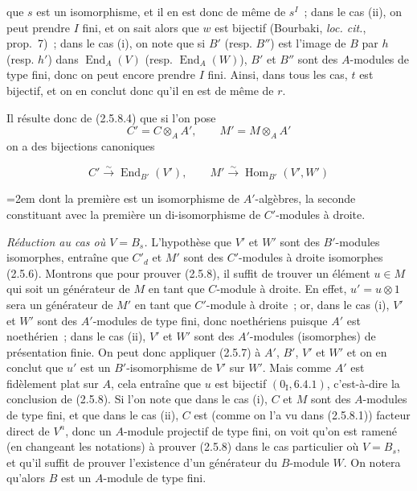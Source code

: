 que $s$ est un isomorphisme, et il en est donc de même de $s^I$~; dans le cas
(ii), on peut prendre $I$ fini, et on sait alors que $w$ est bijectif
(Bourbaki, \emph{loc. cit.}, prop.~7)~; dans le cas (i), on note que si $B'$
(resp. $B''$) est l'image de $B$ par $h$ (resp. $h'$) dans
$\operatorname{End}_A(V)$ (resp. $\operatorname{End}_A(W)$), $B'$ et $B''$
sont des $A$-modules de type fini, donc on peut encore prendre $I$ fini.
Ainsi, dans tous les cas, $t$ est bijectif, et on en conclut donc qu'il en est
de même de $r$.

Il résulte donc de (2.5.8.4) que si l'on pose
\[
C'=C\otimes_A A',\qquad M'=M\otimes_A A'
\]
on a des bijections canoniques

\begin{env}[2.5.8.6]
\label{IV.2.5.8.6-fr}
\[
C'\xrightarrow{\sim}\operatorname{End}_{B'}(V'),\qquad
M'\xrightarrow{\sim}\operatorname{Hom}_{B'}(V',W')
\]
{\emergencystretch=2em
dont la première est un isomorphisme de $A'$-algèbres, la seconde constituant
avec la première un di-isomorphisme de $C'$-modules à droite.\par}
\end{env}

\begin{env}[2.5.8.7]
\label{IV.2.5.8.7-fr}
\emph{Réduction au cas où $V=B_s$.} L'hypothèse que $V'$ et $W'$ sont des
$B'$-modules isomorphes, entraîne que $C'_d$ et $M'$ sont des $C'$-modules à
droite isomorphes (2.5.6). Montrons que pour prouver (2.5.8), il suffit de
trouver un élément $u\in M$ qui soit un générateur de $M$ en tant que
$C$-module à droite. En effet, $u'=u\otimes1$ sera un générateur de $M'$ en
tant que $C'$-module à droite~; or, dans le cas (i), $V'$ et $W'$ sont des
$A'$-modules de type fini, donc noethériens puisque $A'$ est noethérien~;
dans le cas (ii), $V'$ et $W'$ sont des $A'$-modules (isomorphes) de
présentation finie. On peut donc appliquer (2.5.7) à $A'$, $B'$, $V'$ et
$W'$ et on en conclut que $u'$ est un $B'$-isomorphisme de $V'$ sur $W'$.
Mais comme $A'$ est fidèlement plat sur $A$, cela entraîne que $u$ est
bijectif $(0_{\mathrm I},6.4.1)$, c'est-à-dire la conclusion de (2.5.8). Si
l'on note que dans le cas (i), $C$ et $M$ sont des $A$-modules de type fini,
et que dans le cas (ii), $C$ est (comme on l'a vu dans (2.5.8.1)) facteur
direct de $V^n$, donc un $A$-module projectif de type fini, on voit qu'on est
ramené (en changeant les notations) à prouver (2.5.8) dans le cas particulier
où $V=B_s$, et qu'il suffit de prouver l'existence d'un générateur du
$B$-module $W$. On notera qu'alors $B$ est un $A$-module de type fini.
\end{env}


